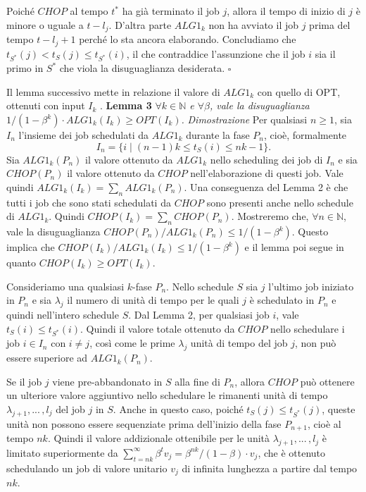 \documentclass[12pt]{article}
\newcommand*{\N}{\mathbb{N}}
\begin{document}
Poiché $CHOP$  al tempo $t^{*}$ ha già terminato il job $j$,  allora il tempo di inizio di $j$ è minore o uguale a $t - l_{j}$. D'altra parte $ALG1_{k}$ non ha avviato il job $j$ prima del tempo $t - l_{j} + 1$ perché lo sta ancora elaborando. Concludiamo che $t_{S^{*}}(j) < t_{S}(j) \leq t_{S^{*}}(i)$, il che contraddice l'assunzione che il job $i$ sia il primo in $S^{*}$ che viola la disuguaglianza desiderata. \hfill $\square$ \vspace{5mm} 

Il lemma successivo mette in relazione il valore di $ALG1_{k}$ con quello di OPT, ottenuti con input $I_{k}$ . \newline\newline
\textbf{Lemma 3} 
\textit{$\forall k \in \N$ e $\forall \beta$, vale la disuguaglianza $1/(1-\beta^{k} ) \cdot ALG1_{k}(I_{k}) \geq OPT(I_{k})$.}\newline\newline
\textit{Dimostrazione}
Per qualsiasi $n \geq 1$, sia $I_{n}$ l'insieme dei job schedulati da $ALG1_{k}$ durante la fase $P_{n}$, cioè, formalmente $$I_{n} = \{i\;| \; (n - 1)k \leq t_{S}(i) \leq nk - 1\}.$$ Sia $ALG1_{k}(P_{n})$ il valore ottenuto da $ALG1_{k}$ nello scheduling dei job di $I_{n}$ e sia $CHOP(P_{n})$ il valore ottenuto da $CHOP$ nell'elaborazione di questi job. Vale quindi $ALG1_{k}(I_{k}) = \sum_{n} ALG1_{k}(P_{n})$. Una conseguenza del Lemma 2 è che tutti i job che sono stati schedulati da $CHOP$ sono presenti anche nello schedule di $ALG1_{k}$. Quindi $CHOP(I_{k}) = \sum_{n} CHOP(P_{n})$. Mostreremo che, $\forall n \in \N$, vale la disuguaglianza $CHOP(P_{n})/ALG1_{k} (P_{n}) \leq 1/(1 - \beta^{k})$. Questo implica che $CHOP(I_{k})/ALG1_{k} (I_{k} ) \leq 1/(1 - \beta^{k})$ e il lemma poi segue in quanto $CHOP(I_{k}) \geq OPT(I_{k})$. 

Consideriamo una qualsiasi $k$-fase $P_{n}$. Nello schedule $S$ sia $j$ l'ultimo job iniziato in $P_{n}$ e sia $\lambda_{j}$ il numero di unità di tempo per le quali $j$ è schedulato in $P_{n}$ e quindi nell'intero schedule $S$. Dal Lemma 2, per qualsiasi job $i$, vale $t_{S}(i) \leq t_{S^{*}}(i)$. Quindi il valore totale ottenuto da $CHOP$ nello schedulare i job $i \in I_{n}$ con $i \neq j$, così come le prime $\lambda_{j}$ unità di tempo del job $j$, non può essere superiore ad $ALG1_{k}(P_{n})$. 

Se il job $j$ viene pre-abbandonato in $S$ alla fine di $P_{n}$, allora $CHOP$ può ottenere un ulteriore valore aggiuntivo nello schedulare le rimanenti unità di tempo $\lambda_{j + 1},...\,, l_{j}$ del job $j$ in $S$. Anche in questo caso, poiché $t_{S}(j) \leq t_{S^{*}}(j)$, queste unità non possono essere sequenziate prima dell'inizio della fase $P_{n+1}$, cioè al tempo $nk$. Quindi il valore addizionale ottenibile per le unità $\lambda_{j + 1},...\,,l_{j}$ è limitato superiormente da $\sum_{t=nk}^{\infty} \beta^{t} v_{j} = \beta^{nk}/(1 - \beta ) \cdot v_{j}$, che è ottenuto schedulando un job di valore unitario $v_{j}$ di infinita lunghezza a partire dal tempo $nk$. 
\end{document}
